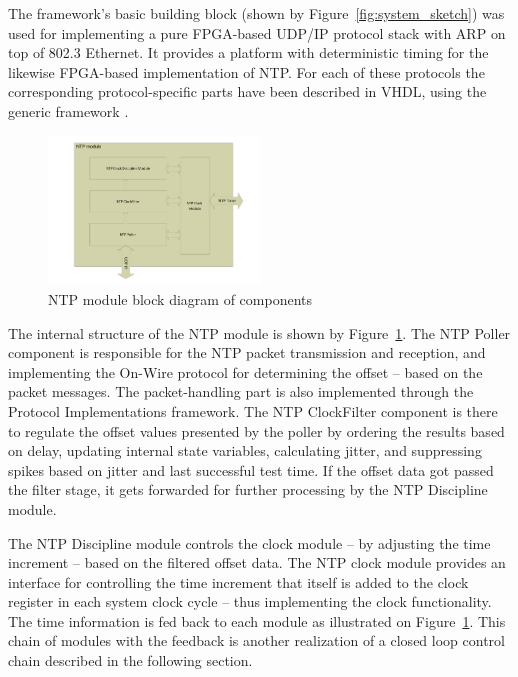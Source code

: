 \documentclass[journal]{IEEEtran}
\begin{document}
The framework's basic building block (shown by Figure~\ref{fig:system_sketch}) was used for implementing a pure FPGA-based
UDP/IP protocol stack with ARP \cite{ARP_RFC826} on top of 802.3 Ethernet. It provides a platform with deterministic timing for the
likewise FPGA-based
implementation of NTP. For each of these protocols the corresponding protocol-specific parts have been described in
VHDL, using the generic framework \cite{ProtoImpl}.

\begin{figure}[!htb]
    \centering
    \includegraphics[width=0.5\textwidth]{figures_raw/ntp-sketch.pdf}
    \caption{NTP module block diagram of components}
    \label{fig:ntp-impl}
\end{figure}

The internal structure of the NTP module is shown by Figure~\ref{fig:ntp-impl}. The NTP Poller component is responsible
for the NTP packet transmission and reception, and implementing the On-Wire protocol
for determining the offset -- based on the packet messages. The packet-handling part is also implemented
through the Protocol Implementations framework. The NTP ClockFilter component is there to regulate the offset values
presented by the poller by ordering the results based on delay, updating internal state variables, calculating jitter,
and
suppressing spikes based on jitter and last successful test time. If the offset data got passed the filter stage, it gets
forwarded for further processing by the NTP Discipline module.

The NTP Discipline module controls the clock module -- by adjusting the time increment -- based on the filtered offset
data. The NTP clock module provides an interface for controlling the time increment that itself is added to the clock
register in each system clock cycle -- thus
implementing the clock functionality. The time information is fed back to each module as illustrated on
Figure~\ref{fig:ntp-impl}.
This chain of modules with the feedback is another realization of a closed loop control chain described in the following section.
\end{document}
